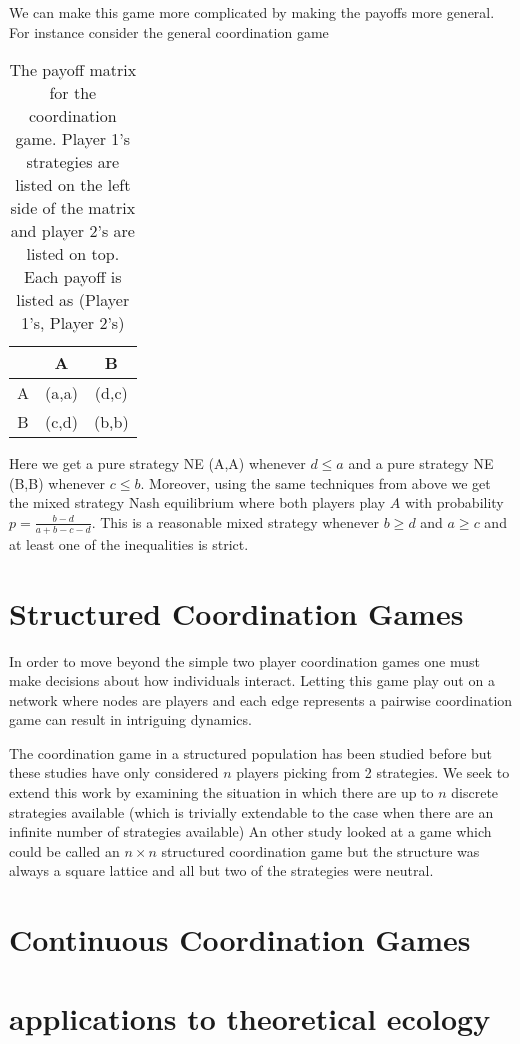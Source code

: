 \documentclass[]{article}
\begin{document}
	We can make this game more complicated by making the payoffs more general. For instance consider the general coordination game
	\begin{table}[h]\centering
		\begin{tabular}{c|cc}
			& A&B\\
			\hline
			A&(a,a)&(d,c)\\
			B&(c,d)&(b,b)
		\end{tabular}
		\caption{The payoff matrix for the coordination game. Player 1's strategies are listed on the left side of the matrix and player 2's are listed on top. Each payoff is listed as (Player 1's, Player 2's)}
	\end{table}
	
	Here we get a pure strategy NE (A,A) whenever $d\leq a$ and a pure strategy NE (B,B) whenever $c\leq b$. Moreover, using the same techniques from above we get the mixed strategy Nash equilibrium where both players play $A$ with probability $p=\frac{b-d}{a+b-c-d}$. This is a reasonable mixed strategy whenever $b\geq d$ and $a\geq c$ and at least one of the inequalities is strict. 
		
\section{Structured Coordination Games}
	In order to move beyond the simple two player coordination games one must make decisions about how individuals interact. Letting this game play out on a network where nodes are players and each edge represents a pairwise coordination game can result in intriguing dynamics. 
	
	The coordination game in a structured population has been studied before \cite{Buskens2016, Tomassini2010} but these studies have only considered $n$ players picking from 2 strategies. We seek to extend this work by examining the situation in which there are up to $n$ discrete strategies available (which is trivially extendable to the case when there are an infinite number of strategies available)
	An other study looked at a game which could be called an $n\times n$ structured coordination game\cite{Szabo2016} but the structure was always a square lattice and all but two of the strategies were neutral. 
\section{Continuous Coordination Games}
\section{applications to theoretical ecology}


\end{document}
